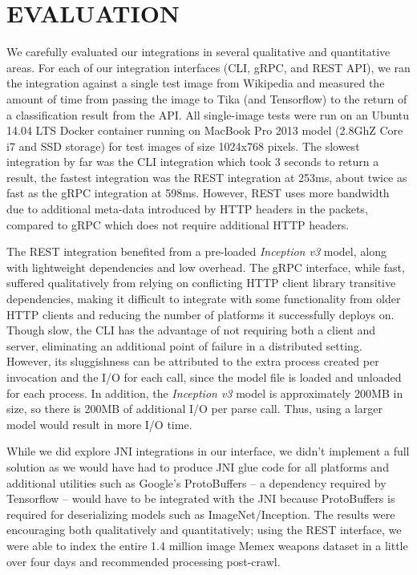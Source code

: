 \section {EVALUATION} \label{sec:evaluation}

We carefully evaluated our integrations in several qualitative and quantitative areas. For each of our integration interfaces (CLI, gRPC, and REST API), we ran the integration against a single test image from Wikipedia and measured the amount of time from passing the image to Tika (and Tensorflow) to the return of a classification result from the API. All single-image tests were run on an Ubuntu 14.04 LTS Docker container running on MacBook Pro 2013 model (2.8GhZ Core i7 and SSD storage) for test images of size 1024x768 pixels. The slowest integration by far was the CLI integration which took 3 seconds to return a result, the fastest integration was the REST integration at 253ms, about twice as fast as the gRPC integration at 598ms. However, REST uses more bandwidth due to additional meta-data introduced by HTTP headers in the packets, compared to gRPC which does not require additional HTTP headers.

The REST integration benefited from a pre-loaded \textit{Inception v3} model, along with lightweight dependencies and low overhead. The gRPC interface, while fast, suffered qualitatively from relying on conflicting HTTP client library transitive dependencies, making it difficult to integrate with some functionality from older HTTP clients and reducing the number of platforms it successfully deploys on. Though slow, the CLI has the advantage of not requiring both a client and server, eliminating an additional point of failure in a distributed setting. However, its sluggishness can be attributed to the extra process created per invocation and the I/O for each call, since the model file is loaded and unloaded for each process. In addition, the \textit{Inception v3} model is approximately 200MB in size, so there is 200MB of additional I/O per parse call. Thus, using a larger model would result in more I/O time.

While we did explore JNI integrations in our interface, we didn't implement a full solution as we would have had to produce JNI glue code for all platforms and additional utilities such as Google's ProtoBuffers -- a dependency required by Tensorflow -- would have to be integrated with the JNI because ProtoBuffers is required for deserializing models such as ImageNet/Inception\cite{javacpp-240}. The results  were encouraging both qualitatively and quantitatively; using the REST interface, we were able to index the entire 1.4 million image Memex weapons dataset in a little over four days and recommended processing post-crawl. 

